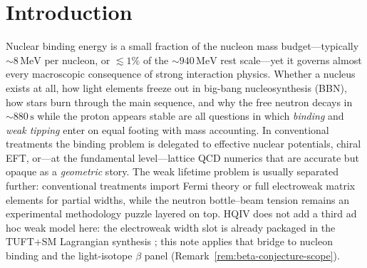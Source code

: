 \documentclass[11pt,notitlepage]{amsart}
\newcommand{\leanid}[1]{{\footnotesize\path{#1}}}
\providecommand{\leanCertAnomaly}{}
\providecommand{\leanCertTopology}{}
\providecommand{\leanCertStrongColor}{}
\providecommand{\leanPatchHolonomyWitness}{}
\providecommand{\leanPatchWilsonKinetic}{}
\providecommand{\leanPatchHaarMeasure}{}
\providecommand{\leanPatchDiscretePoincare}{}
\providecommand{\leanPatchSpatialRotation}{}
\begin{document}
\renewcommand{\leanCertAnomaly}{; see Appendix~\ref{app:lean-index},
\hyperref[lean:anomaly-cancellation]{anomaly cancellation}}
\renewcommand{\leanCertTopology}{; see
\hyperref[lean:patch-topology-discharge]{patch topology discharge}}
\renewcommand{\leanCertStrongColor}{; optional strong-colour certificate in the Lean catalog}
\renewcommand{\leanPatchHolonomyWitness}{(\hyperref[lean:so8-plaquette]{SO(8) plaquette holonomy},
witness \leanid{so8PlaquetteHolonomyDischarged_holds})}
\renewcommand{\leanPatchWilsonKinetic}{(\hyperref[lean:action-holonomy-glue]{Wilson--kinetic glue},
witness \leanid{wilsonKineticPlaquetteEquivalence_discharged})}
\renewcommand{\leanPatchHaarMeasure}{(\hyperref[lean:non-abelian-haar]{non-abelian Haar measure scaffold})}
\renewcommand{\leanPatchDiscretePoincare}{(\hyperref[lean:discrete-action-poincare]{discrete action Poincaré programme})}
\renewcommand{\leanPatchSpatialRotation}{(\hyperref[lean:spatial-rotation-lorentz-closure]{spatial-rotation Lorentz closure},
witness \leanid{spatial_rotation_lorentz_closure_discharged})}



\section{Introduction}
\label{sec:introduction}

Nuclear binding energy is a small fraction of the nucleon mass budget---typically
$\sim 8\,\mathrm{MeV}$ per nucleon, or $\lesssim 1\%$ of the $\sim 940\,\mathrm{MeV}$
rest scale---yet it governs almost every macroscopic consequence of strong interaction
physics. Whether a nucleus exists at all, how light elements freeze out in big-bang
nucleosynthesis (BBN), how stars burn through the main sequence, and why the free
neutron decays in $\sim 880\,\mathrm{s}$ while the proton appears stable are all
questions in which \emph{binding} and \emph{weak tipping} enter on equal footing with
mass accounting. In conventional treatments the binding problem is delegated to
effective nuclear potentials, chiral EFT, or---at the fundamental level---lattice QCD
numerics that are accurate but opaque as a \emph{geometric} story. The weak lifetime
problem is usually separated further: conventional treatments import Fermi theory or
full electroweak matrix elements for partial widths, while the neutron bottle--beam
tension remains an experimental methodology puzzle layered on top. HQIV does not add a
third ad hoc weak model here: the electroweak width slot is already packaged in the
TUFT+SM Lagrangian synthesis \cite{hqiv-tuft-sm-lagrangian-paper}; this note applies
that bridge to nucleon binding and the light-isotope $\beta$ panel
(Remark~\ref{rem:beta-conjecture-scope}).
\end{document}
